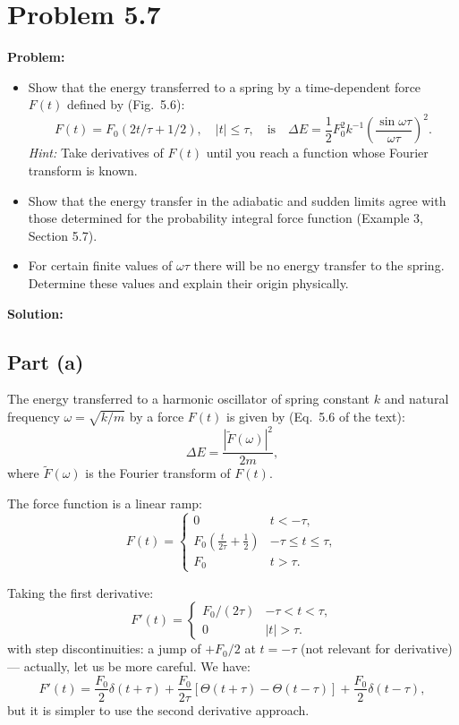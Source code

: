 \documentclass[12pt]{article}
\begin{document}
\section*{Problem 5.7}

\textbf{Problem:}
\begin{itemize}
\item[(a)] Show that the energy transferred to a spring by a time-dependent force $F(t)$ defined by (Fig.\ 5.6):
\[
F(t) = F_0(2t/\tau + 1/2), \quad |t| \leq \tau, \quad \text{is} \quad \Delta E = \frac{1}{2}F_0^2k^{-1}\left(\frac{\sin\omega\tau}{\omega\tau}\right)^2.
\]
\emph{Hint:} Take derivatives of $F(t)$ until you reach a function whose Fourier transform is known.

\item[(b)] Show that the energy transfer in the adiabatic and sudden limits agree with those determined for the probability integral force function (Example 3, Section 5.7).

\item[(c)] For certain finite values of $\omega\tau$ there will be no energy transfer to the spring. Determine these values and explain their origin physically.
\end{itemize}

\bigskip
\textbf{Solution:}

\subsection*{Part (a)}

The energy transferred to a harmonic oscillator of spring constant $k$ and natural frequency $\omega = \sqrt{k/m}$ by a force $F(t)$ is given by (Eq.\ 5.6 of the text):
\[
\Delta E = \frac{|\tilde{F}(\omega)|^2}{2m},
\]
where $\tilde{F}(\omega)$ is the Fourier transform of $F(t)$.

The force function is a linear ramp:
\[
F(t) = \begin{cases} 0 & t < -\tau, \\ F_0\left(\frac{t}{2\tau} + \frac{1}{2}\right) & -\tau \leq t \leq \tau, \\ F_0 & t > \tau. \end{cases}
\]

Taking the first derivative:
\[
F'(t) = \begin{cases} F_0/(2\tau) & -\tau < t < \tau, \\ 0 & |t| > \tau. \end{cases}
\]
with step discontinuities: a jump of $+F_0/2$ at $t=-\tau$ (not relevant for derivative) --- actually, let us be more careful. We have:
\[
F'(t) = \frac{F_0}{2}\delta(t+\tau) + \frac{F_0}{2\tau}[\Theta(t+\tau)-\Theta(t-\tau)] + \frac{F_0}{2}\delta(t-\tau),
\]
but it is simpler to use the second derivative approach.
\end{document}
